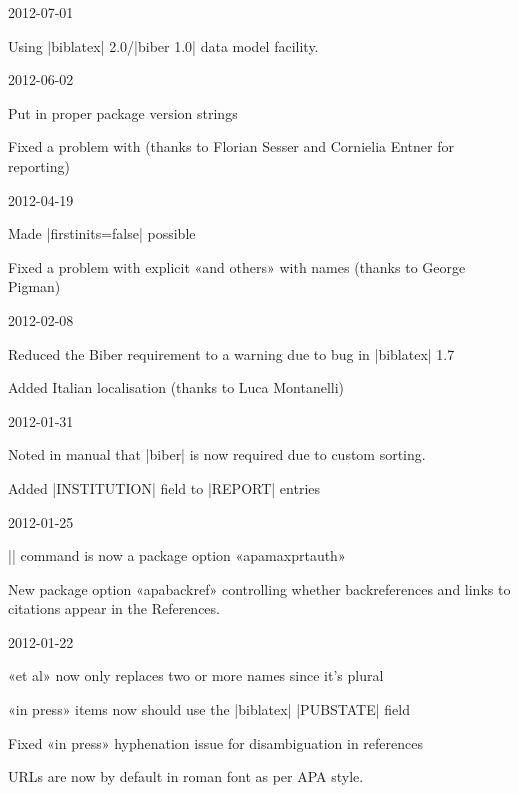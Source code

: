 \documentclass{ltxdockit}
\begin{document}
\begin{changelog}
\begin{release}{5.0}{2012-07-01}
\item Using |biblatex| 2.0/|biber 1.0| data model facility.
\end{release}

\begin{release}{4.8}{2012-06-02}
\item Put in proper package version strings
\item Fixed a problem with  (thanks to Florian Sesser and
  Cornielia Entner for reporting)
\end{release}

\begin{release}{4.7}{2012-04-19}
\item Made |firstinits=false| possible
\item Fixed a problem with explicit «and others» with names (thanks to
  George Pigman)
\end{release}

\begin{release}{4.6}{2012-02-08}
\item Reduced the Biber requirement to a warning due to bug in |biblatex| 1.7
\item Added Italian localisation (thanks to Luca Montanelli)
\end{release}

\begin{release}{4.5}{2012-01-31}
\item Noted in manual that |biber| is now required due to custom sorting.
\item Added |INSTITUTION| field to |REPORT| entries
\end{release}

\begin{release}{4.4}{2012-01-25}
\item |\maxprtauth| command is now a package option «apamaxprtauth»
\item New package option «apabackref» controlling whether
  backreferences and links to citations appear in the References.
\end{release}

\begin{release}{4.3}{2012-01-22}
\item «et al» now only replaces two or more names since it's plural
\item «in press» items now should use the |biblatex| |PUBSTATE| field
\item Fixed «in press» hyphenation issue for disambiguation in references
\item URLs are now by default in roman font as per APA style.
\end{release}


\end{changelog}
\end{document}
